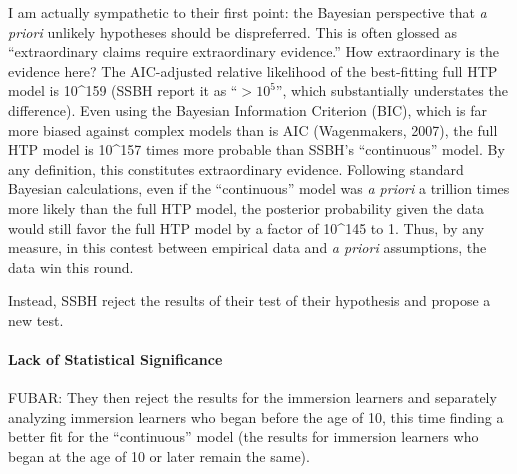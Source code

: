 \documentclass[
  english,
  doc,floatsintext]{apa6}
\let\oldparagraph\paragraph
\renewcommand{\paragraph}[1]{\oldparagraph{#1}\mbox{}}
\begin{document}
I am actually sympathetic to their first point: the Bayesian perspective that \emph{a priori} unlikely hypotheses should be dispreferred. This is often glossed as ``extraordinary claims require extraordinary evidence.'' How extraordinary is the evidence here? The AIC-adjusted relative likelihood of the best-fitting full HTP model is 10\^{}159 (SSBH report it as ``\(>10^5\)'', which substantially understates the difference). Even using the Bayesian Information Criterion (BIC), which is far more biased against complex models than is AIC (Wagenmakers, 2007), the full HTP model is 10\^{}157 times more probable than SSBH's ``continuous'' model. By any definition, this constitutes extraordinary evidence. Following standard Bayesian calculations, even if the ``continuous'' model was \emph{a priori} a trillion times more likely than the full HTP model, the posterior probability given the data would still favor the full HTP model by a factor of 10\^{}145 to 1. Thus, by any measure, in this contest between empirical data and \emph{a priori} assumptions, the data win this round.

Instead, SSBH reject the results of their test of their hypothesis and propose a new test.

\hypertarget{lack-of-statistical-significance}{%
\paragraph{Lack of Statistical Significance}\label{lack-of-statistical-significance}}

FUBAR: They then reject the results for the immersion learners and separately analyzing immersion learners who began before the age of 10, this time finding a better fit for the ``continuous'' model (the results for immersion learners who began at the age of 10 or later remain the same).
\end{document}

